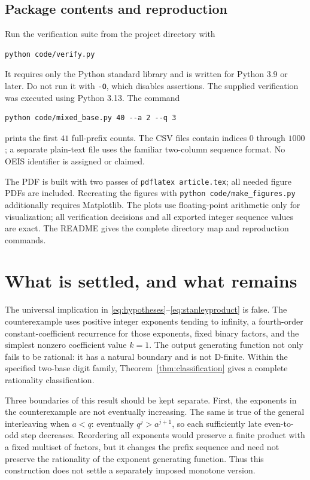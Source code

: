 \documentclass[11pt,letterpaper]{article}
\numberwithin{equation}{section}
\theoremstyle{definition}
\theoremstyle{remark}
\begin{document}
\subsection{Package contents and reproduction}
Run the verification suite from the project directory with
\begin{lstlisting}
python code/verify.py
\end{lstlisting}
It requires only the Python standard library and is written for Python
3.9 or later. Do not run it with \texttt{-O}, which disables assertions.
The supplied verification was executed using Python 3.13.
The command
\begin{lstlisting}
python code/mixed_base.py 40 --a 2 --q 3
\end{lstlisting}
prints the first $41$ full-prefix counts.
The CSV files contain indices $0$ through $1000$; a separate plain-text
file uses the familiar two-column sequence format. No OEIS identifier is
assigned or claimed.

The PDF is built with two passes of \texttt{pdflatex article.tex}; all
needed figure PDFs are included. Recreating the figures with
\texttt{python code/make\_figures.py} additionally requires Matplotlib.
The plots use floating-point arithmetic only for visualization; all
verification decisions and all exported integer sequence values are exact.
The README gives the complete directory map and reproduction commands.

\section{What is settled, and what remains}\label{sec:scope}

The universal implication in \eqref{eq:hypotheses}--\eqref{eq:stanleyproduct}
is false. The counterexample uses positive integer exponents tending to
infinity, a fourth-order constant-coefficient recurrence for those exponents,
fixed binary factors, and the simplest nonzero coefficient value $k=1$.
The output generating function not only fails to be rational: it has a
natural boundary and is not D-finite. Within the specified two-base digit
family, Theorem~\ref{thm:classification} gives a complete rationality
classification.

Three boundaries of this result should be kept separate. First, the
exponents in the counterexample are not eventually increasing. The same
is true of the general interleaving when $a<q$: eventually $q^j>a^{j+1}$,
so each sufficiently late even-to-odd step decreases. Reordering all
exponents would preserve a finite product with a fixed multiset of
factors, but it changes the prefix sequence and need not preserve the
rationality of the exponent generating function. Thus this construction
does not settle a separately imposed monotone version.
\end{document}
